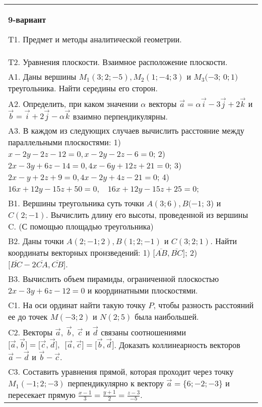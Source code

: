 \documentclass{article}
\begin{document}
\begin{tabular}{m{17cm}}
\textbf{9-вариант}
\newline

T1. Предмет и методы аналитической геометрии.
 \\
T2. 
Уравнения плоскости. Взаимное расположение плоскости.
 \\
A1. 
Даны вершины \(M_{1}(3;2; - 5),M_{2}(1; - 4;3)\) и \(M_{3}( - 3\); \(0;1)\) треугольника. Найти середины его сторон.
 \\
A2. 
Определить, при каком значении \(\alpha\) векторы \(\overrightarrow{a} = \alpha\overrightarrow{i} - 3\overrightarrow{j} + 2\overrightarrow{k}\) и \(\overrightarrow{b} = \overrightarrow{i} + 2\overrightarrow{j} - \alpha\overrightarrow{k}\) взаимно перпендикулярны.
 \\
A3. 
В каждом из следующих случаев вычислить расстояние между параллельными плоскостями: 1) \(x - 2y - 2z - 12 = 0,x - 2y - 2z - 6 = 0\); 2) \(2x - 3y + 6z - 14 = 0,4x - 6y + 12z + 21 = 0\); 3) \(2x - y + 2z + 9 = 0,4x - 2y + 4z - 21 = 0\); 4) \(16x + 12y - 15z + 50 = 0,\ \ \ \ 16x + 12y - 15z + 25 = 0\);
 \\
B1. 
Вершины треугольника суть точки \(A(3;6),B( - 1\); 3) и \(C(2; - 1)\). Вычислить длину его высоты, проведенной из вершины C. (С помощью площадью треугольника)
 \\
B2. 
Даны точки \(A(2; - 1;2),B(1;2; - 1)\) и \(C(3;2;1)\). Найти координаты векторных пронзведений: 1) \(\lbrack\overline{AB},\overline{BC}\rbrack\); 2) \(\lbrack\overline{BC} - 2\overline{CA},\overline{CB}\rbrack\).
 \\
B3. 
Вычислить объем пирамиды, ограниченной плоскостью \(2x - 3y + 6z - 12 = 0\) и координатными плоскостями.
 \\
C1. 
На оси ординат найти такую точку \(P\), чтобы разность расстояний ее до точек \(M( - 3;2)\) и \(N(2;5)\) была наибольшей.
 \\
C2. 
Векторы \(\overrightarrow{a},\ \overrightarrow{b},\ \overrightarrow{c}\) и \(\overrightarrow{d}\) связаны соотношениями \(\lbrack\overrightarrow{a},\overrightarrow{b}\rbrack = \lbrack\overrightarrow{c},\overrightarrow{d}\rbrack,\ \ \lbrack\overrightarrow{a},\overrightarrow{c}\rbrack = \lbrack\overrightarrow{b},\overrightarrow{d}\rbrack\). Доказать коллинеарность векторов \(\overrightarrow{a} - \overrightarrow{d}\) и \(\overrightarrow{b} - \overrightarrow{c}\).
 \\
C3. 
Составить уравнения прямой, которая проходит через точку \(M_{1}( - 1;2; - 3)\) перпендикулярно к вектору \(\overrightarrow{a} = \{ 6; - 2; - 3\}\) и пересекает прямую \(\frac{x - 1}{3} = \frac{y + 1}{2} = \frac{z - 3}{- 5}\).
 \\

\end{tabular}
\vspace{1cm}
\end{document}
